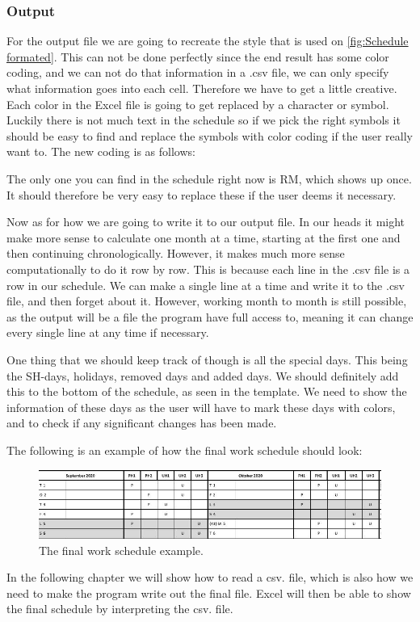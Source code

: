 \subsubsection{Output}
For the output file we are going to recreate the style that is used on \ref{fig:Schedule formated}. This can not be done perfectly since the end result has some color coding, and we can not do that information in a .csv file, we can only specify what information goes into each cell. Therefore we have to get a little creative. Each color in the Excel file is going to get replaced by a character or symbol. Luckily there is not much text in the schedule so if we pick the right symbols it should be easy to find and replace the symbols with color coding if the user really want to. The new coding is as follows:

\begin{itemize}
\end{itemize}

The only one you can find in the schedule right now is RM, which shows up once. It should therefore be very easy to replace these if the user deems it necessary. 

Now as for how we are going to write it to our output file. In our heads it might make more sense to calculate one month at a time, starting at the first one and then continuing chronologically. However, it makes much more sense computationally to do it row by row. This is because each line in the .csv file is a row in our schedule. We can make a single line at a time and write it to the .csv file, and then forget about it. However, working month to month is still possible, as the output will be a file the program have full access to, meaning it can change every single line at any time if necessary.

One thing that we should keep track of though is all the special days. This being the SH-days, holidays, removed days and added days. We should definitely add this to the bottom of the schedule, as seen in the template. We need to show the information of these days as the user will have to mark these days with colors, and to check if any significant changes has been made.

The following is an example of how the final work schedule should look:

\begin{figure}[ht!]
    \centering
    \includegraphics[width=\textwidth]{media/p1 schedule.JPG}
    \caption{The final work schedule example.}
    \label{fig:Output_example}
\end{figure}
 In the following chapter we will show how to read a csv. file, which is also how we need to make the program write out the final file. Excel will then be able to show the final schedule by interpreting the csv. file.

